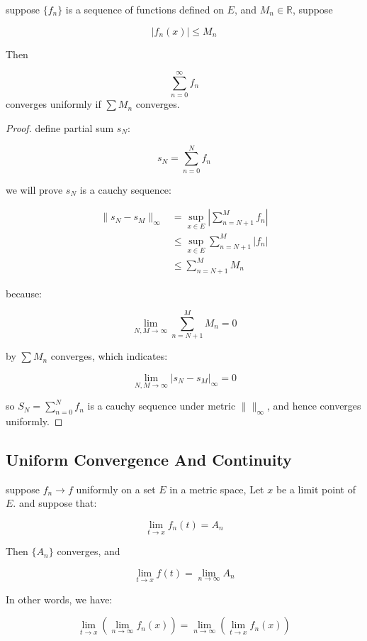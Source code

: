 \begin{thm}
    suppose $\{ f_n\}$ is a sequence of functions defined on $E$, and $M_n \in \mathbb{R}$, suppose

    \[
        \left| f_n(x)\right| \le M_n
    \]

    Then

    \[
        \sum_{n=0}^{\infty} f_n 
    \]
    converges uniformly if $\sum M_n$ converges.
\end{thm}

\begin{proof}
    define partial sum $s_N$:

    \[
        s_N = \sum_{n=0}^{N} f_n
    \]

    we will prove $s_N$ is a cauchy sequence:

    \begin{align*}
        \|s_N -  s_M\|_{\infty} &= \sup_{x \in E} \left| \sum_{n=N+1}^{M} f_n \right| \\
        & \le \sup_{x \in E} \sum_{n=N+1}^{M} \left| f_n  \right| \\
        & \le  \sum_{n=N+1}^{M} M_n 
    \end{align*}

    because:

    \[
        \lim_{N,M \to \infty} \sum_{n=N+1}^{M} M_n = 0
    \]

    by $\sum M_n$ converges, which indicates:

    \[
        \lim_{N,M \to \infty}  \left|s_N - s_M\right|_\infty = 0
    \]

    so $S_N = \sum_{n=0}^{N}f_n$ is a cauchy sequence under metric $\| \|_\infty$, and hence converges uniformly.
\end{proof}

\subsection{Uniform Convergence And Continuity}

\begin{thm}
    suppose $f_n \to f$ uniformly on a set $E$ in a metric space, Let $x$
    be a limit point of $E$. and suppose that:

    \[
        \lim_{t \to x}f_n(t) = A_n
    \]

    Then $\{ A_n \} $ converges, and

    \[
        \lim_{t \to x}f(t) = \lim_{n \to \infty}A_n
    \]

    In other words, we have:

    \[
        \lim_{t \to x} \left(\lim_{n \to \infty}f_n(x) \right) = \lim_{n \to \infty} \left(\lim_{t \to x}f_n(x) \right)
    \]
\end{thm}

